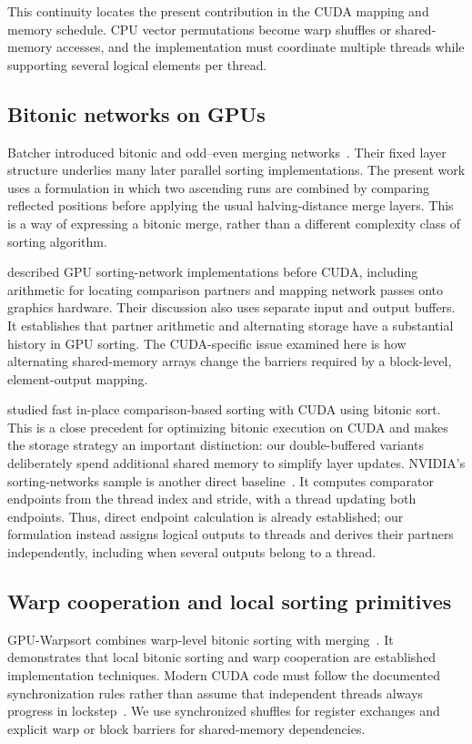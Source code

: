 \documentclass[fleqn,10pt,lineno]{wlpeerj}
\begin{document}
This continuity locates the present contribution in the CUDA mapping and memory schedule. CPU vector permutations become warp shuffles or shared-memory accesses, and the implementation must coordinate multiple threads while supporting several logical elements per thread.

\subsection*{Bitonic networks on GPUs}
Batcher introduced bitonic and odd--even merging networks~\citep{batcher1968sorting}. Their fixed layer structure underlies many later parallel sorting implementations. The present work uses a formulation in which two ascending runs are combined by comparing reflected positions before applying the usual halving-distance merge layers. This is a way of expressing a bitonic merge, rather than a different complexity class of sorting algorithm.

\citet{kipfer2005improved} described GPU sorting-network implementations before CUDA, including arithmetic for locating comparison partners and mapping network passes onto graphics hardware. Their discussion also uses separate input and output buffers. It establishes that partner arithmetic and alternating storage have a substantial history in GPU sorting. The CUDA-specific issue examined here is how alternating shared-memory arrays change the barriers required by a block-level, element-output mapping.

\citet{peters2011bitonic} studied fast in-place comparison-based sorting with CUDA using bitonic sort. This is a close precedent for optimizing bitonic execution on CUDA and makes the storage strategy an important distinction: our double-buffered variants deliberately spend additional shared memory to simplify layer updates. NVIDIA's sorting-networks sample is another direct baseline~\citep{nvidiaSortingNetworks}. It computes comparator endpoints from the thread index and stride, with a thread updating both endpoints. Thus, direct endpoint calculation is already established; our formulation instead assigns logical outputs to threads and derives their partners independently, including when several outputs belong to a thread.

\subsection*{Warp cooperation and local sorting primitives}
GPU-Warpsort combines warp-level bitonic sorting with merging~\citep{ye2010warpsort}. It demonstrates that local bitonic sorting and warp cooperation are established implementation techniques. Modern CUDA code must follow the documented synchronization rules rather than assume that independent threads always progress in lockstep~\citep{nvidiaCudaGuide}. We use synchronized shuffles for register exchanges and explicit warp or block barriers for shared-memory dependencies.
\end{document}
